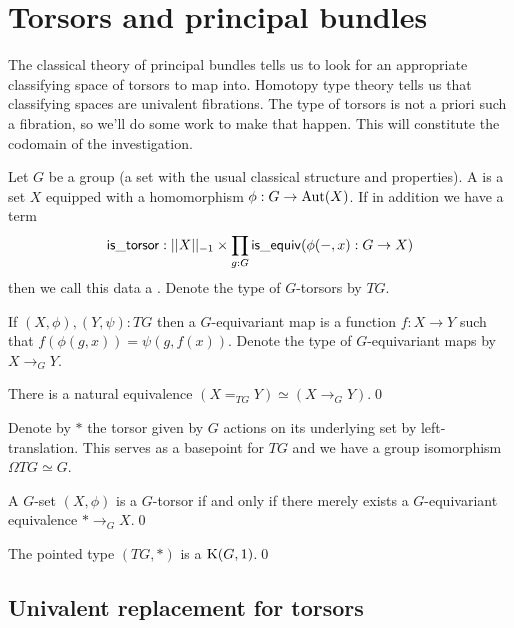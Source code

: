 \section{Torsors and principal bundles}

The classical theory of principal bundles tells us to look for an appropriate classifying space of torsors to map into. Homotopy type theory tells us that classifying spaces are univalent fibrations. The type of torsors is not a priori such a fibration, so we'll do some work to make that happen. This will constitute the codomain of the investigation.

\begin{mydef}
Let \( G \) be a group (a set with the usual classical structure and properties). A  is a set \( X \) equipped with a homomorphism \( \phi:G\to\mathrm{Aut}(X) \). If in addition we have a term
\[ 
\mathsf{is\_torsor}:||X||_{-1}\times \prod_{g:G}\mathsf{is\_equiv}(\phi(-,x):G\to X)
\] then we call this data a . Denote the type of \( G \)-torsors by \( TG \).
\end{mydef}

If \( (X,\phi),(Y,\psi):TG \) then a \( G \)-equivariant map is a function \( f:X\to Y \) such that \( f(\phi(g,x))=\psi(g,f(x)) \). Denote the type of \( G \)-equivariant maps by \( X\to_G Y \).

\begin{mylemma}
There is a natural equivalence \( (X=_{TG}Y) \simeq (X\to_G Y) \).\qed
\end{mylemma}

Denote by \( * \) the torsor given by \( G \) actions on its underlying set by left-translation. This serves as a basepoint for \( TG \) and we have a group isomorphism \( \Omega TG\simeq G \).

\begin{mylemma}
A \( G \)-set \( (X,\phi) \) is a \( G \)-torsor if and only if there merely exists a \( G \)-equivariant equivalence \( *\to_G X \).\qed
\end{mylemma}

\begin{mycor}
The pointed type \( (TG,*) \) is a \( \mathrm{K}(G,1) \).\qed
\end{mycor}

\subsection{Univalent replacement for torsors}

